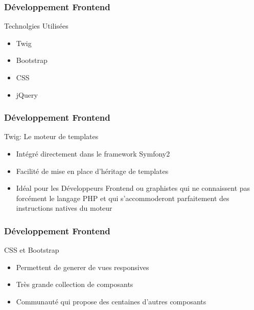 \speaker{\Juliana}

\begin{frame}
\frametitle{Développement Frontend}
\begin{block}{Technolgies Utilisées}
	\begin{itemize}
		\item Twig
		\item Bootstrap
		\item CSS
		\item jQuery
	\end{itemize}
\end{block}
\end{frame}

\begin{frame}
\frametitle{Développement Frontend}
\begin{block}{Twig: Le moteur de templates }
	\begin{itemize}
		\item Intégré directement dans le framework Symfony2
		\item Facilité de mise en place d'héritage de templates
		\item Idéal pour les Développeurs Frontend ou graphistes qui ne connaissent pas forcément le langage PHP et qui s'accommoderont parfaitement des instructions natives du moteur
	\end{itemize}
\end{block}
\end{frame}

\begin{frame}
\frametitle{Développement Frontend}
\begin{block}{ CSS et Bootstrap }
	\begin{itemize}
		\item Permettent de generer de vues responsives
		\item Très grande collection de composants
		\item Communauté qui propose des centaines d'autres composants
	\end{itemize}
\end{block}
\end{frame}

